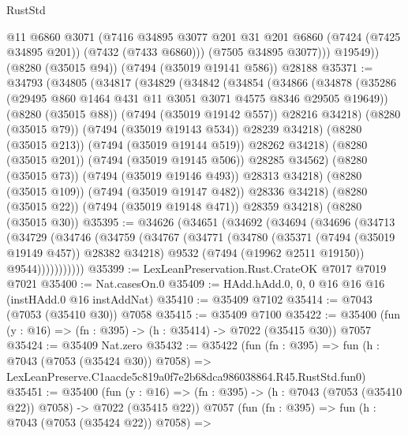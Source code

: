 \begin{lexlean}{RustStd}
\begin{coremodule}
            @11
            @6860
            @3071
            (@7416
              @34895
              @3077
              @201
              @31
              @201
              @6860
              (@7424 (@7425 @34895 @201))
              (@7432 (@7433 @6860)))
            (@7505 @34895 @3077)))
        @19549))
    (@8280 (@35015 @94))
    (@7494 (@35019 @19141 @586))
    @28188
@35371 := @34793
    (@34805
      (@34817
        (@34829
          (@34842
            (@34854
              (@34866
                (@34878
                  (@35286 (@29495 @860 @1464 @431 @11 @3051 @3071 @4575 @8346 @29505 @19649))
                  (@8280 (@35015 @88))
                  (@7494 (@35019 @19142 @557))
                  @28216
                  @34218)
                (@8280 (@35015 @79))
                (@7494 (@35019 @19143 @534))
                @28239
                @34218)
              (@8280 (@35015 @213))
              (@7494 (@35019 @19144 @519))
              @28262
              @34218)
            (@8280 (@35015 @201))
            (@7494 (@35019 @19145 @506))
            @28285
            @34562)
          (@8280 (@35015 @73))
          (@7494 (@35019 @19146 @493))
          @28313
          @34218)
        (@8280 (@35015 @109))
        (@7494 (@35019 @19147 @482))
        @28336
        @34218)
      (@8280 (@35015 @22))
      (@7494 (@35019 @19148 @471))
      @28359
      @34218)
    (@8280 (@35015 @30))
@35395 := @34626
    (@34651
      (@34692
        (@34694
          (@34696
            (@34713
              (@34729
                (@34746
                  (@34759
                    (@34767
                      (@34771
                        (@34780
                          (@35371 (@7494 (@35019 @19149 @457)) @28382 @34218)
                          @9532
                          (@7494 (@19962 @2511 @19150))
                          @9544)))))))))))
@35399 := LexLeanPreservation.Rust.CrateOK @7017 @7019 @7021
@35400 := Nat.casesOn.{0}
@35409 := HAdd.hAdd.{0, 0, 0} @16 @16 @16 (instHAdd.{0} @16 instAddNat)
@35410 := @35409 @7102
@35414 := @7043 (@7053 (@35410 @30)) @7058
@35415 := @35409 @7100
@35422 := @35400 (fun (y : @16) => (fn : @395) -> (h : @35414) -> @7022 (@35415 @30)) @7057
@35424 := @35409 Nat.zero
@35432 := @35422
    (fun (fn : @395) =>
    fun (h : @7043 (@7053 (@35424 @30)) @7058) =>
    LexLeanPreserve.C1aacde5c819a0f7e2b68dca986038864.R45.RustStd.fun0)
@35451 := @35400
    (fun (y : @16) => (fn : @395) -> (h : @7043 (@7053 (@35410 @22)) @7058) -> @7022 (@35415 @22))
    @7057
    (fun (fn : @395) =>
    fun (h : @7043 (@7053 (@35424 @22)) @7058) =>

\end{coremodule}
\end{lexlean}
